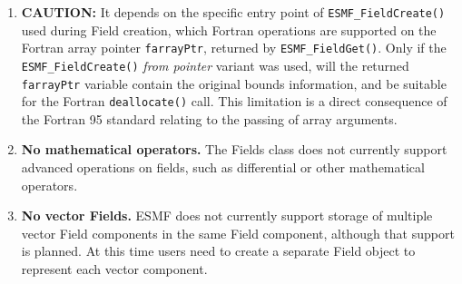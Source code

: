 

\begin{enumerate}
\label{Field:rest}

\item {\bf CAUTION:} It depends on the specific entry point of {\tt ESMF\_FieldCreate()} used during Field creation, which Fortran operations are supported on the Fortran array pointer {\tt farrayPtr}, returned by {\tt ESMF\_FieldGet()}. Only if the {\tt ESMF\_FieldCreate()} {\em from pointer} variant was used, will the returned {\tt farrayPtr} variable contain the original bounds information, and be suitable for the Fortran {\tt deallocate()} call. This limitation is a direct consequence of the Fortran 95 standard relating to the passing of array arguments.

\item {\bf No mathematical operators.}  The Fields class does not 
currently support advanced
operations on fields, such as differential or other
mathematical operators.

\item {\bf No vector Fields.}  ESMF does not currently  support storage of 
multiple vector Field components in the same Field component, although
that support is planned.  At this time users need to create a 
separate Field object to represent each vector component.

\end{enumerate}



